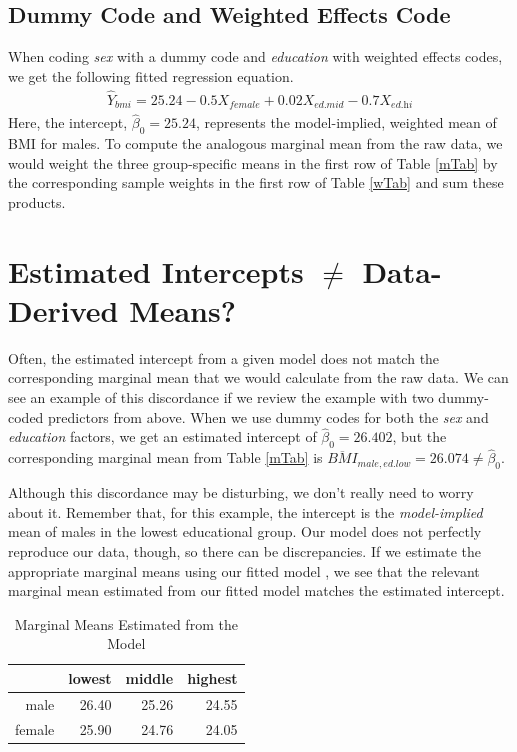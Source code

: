 \documentclass{article}\usepackage[]{graphicx}\usepackage[]{color}
\begin{document}
\subsection{Dummy Code and Weighted Effects Code}



When coding \emph{sex} with a dummy code and \emph{education} with weighted
effects codes, we get the following fitted regression equation.
\begin{align*}
  \hat{Y}_{\textit{bmi}} = 
  25.24 
  -0.5X_{\textit{female}} + 
  0.02X_{\textit{ed.mid}} 
  -0.7X_{\textit{ed.hi}}
\end{align*}
Here, the intercept, $\hat{\beta}_0 = 25.24$, represents the
model-implied, weighted mean of BMI for males. To compute the analogous marginal
mean from the raw data, we would weight the three group-specific means in the
first row of Table \ref{mTab} by the corresponding sample weights in the first
row of Table \ref{wTab} and sum these products.

\section{Estimated Intercepts $\neq$ Data-Derived Means?}

Often, the estimated intercept from a given model does not match the
corresponding marginal mean that we would calculate from the raw data. We can
see an example of this discordance if we review the example with two dummy-coded
predictors from above. When we use dummy codes for both the \emph{sex} and
\emph{education} factors, we get an estimated intercept of $\hat{\beta}_0 =
26.402$, but the corresponding marginal mean from Table
\ref{mTab} is $\overline{\textit{BMI}}_{male,ed.low} = 26.074 \neq \hat{\beta}_0$.

Although this discordance may be disturbing, we don't really need to worry about
it. Remember that, for this example, the intercept is the \emph{model-implied}
mean of males in the lowest educational group. Our model does not perfectly
reproduce our data, though, so there can be discrepancies. If we estimate the
appropriate marginal means using our fitted model \citep[e.g., by using the
  \textbf{emmeans} package,][]{emmeans}, we see that the relevant marginal mean
estimated from our fitted model matches the estimated intercept.

\begin{table}[ht]
\centering
\begin{tabular}{rrrr}
  \toprule
 & lowest & middle & highest \\ 
  \midrule
male & 26.40 & 25.26 & 24.55 \\ 
  female & 25.90 & 24.76 & 24.05 \\ 
   \bottomrule
\end{tabular}
\caption{Marginal Means Estimated from the Model} 
\label{mmTab}
\end{table}
\end{document}
